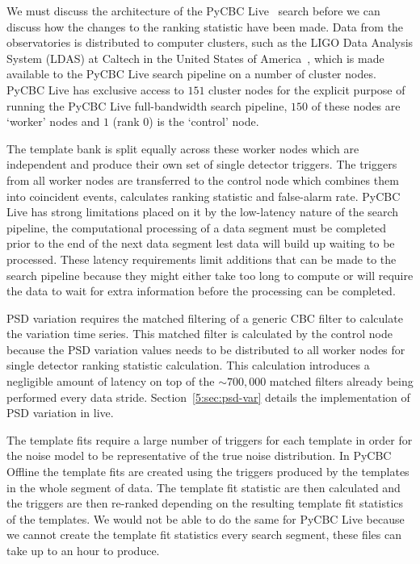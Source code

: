 We must discuss the architecture of the PyCBC Live~\cite{PyCBC_Live:2018} search before we can discuss how the changes to the ranking statistic have been made. Data from the \gwadj observatories is distributed to computer clusters, such as the LIGO Data Analysis System (LDAS) at Caltech in the United States of America~\cite{ldas_caltech:2024}, which is made available to the PyCBC Live search pipeline on a number of cluster nodes. PyCBC Live has exclusive access to $151$ cluster nodes for the explicit purpose of running the PyCBC Live full-bandwidth search pipeline, $150$ of these nodes are `worker' nodes and $1$ (rank 0) is the `control' node.

The template bank is split equally across these worker nodes which are independent and produce their own set of single detector triggers. The triggers from all worker nodes are transferred to the control node which combines them into coincident events, calculates ranking statistic and false-alarm rate. PyCBC Live has strong limitations placed on it by the low-latency nature of the search pipeline, the computational processing of a data segment must be completed prior to the end of the next data segment lest data will build up waiting to be processed. These latency requirements limit additions that can be made to the search pipeline because they might either take too long to compute or will require the data to wait for extra information before the processing can be completed.


PSD variation requires the matched filtering of a generic CBC filter to calculate the variation time series. This matched filter is calculated by the control node because the PSD variation values needs to be distributed to all worker nodes for single detector ranking statistic calculation. This calculation introduces a negligible amount of latency on top of the ${\sim}700,000$ matched filters already being performed every data stride. Section~\ref{5:sec:psd-var} details the implementation of PSD variation in live.

The template fits require a large number of triggers for each template in order for the noise model to be representative of the true noise distribution. In PyCBC Offline the template fits are created using the triggers produced by the templates in the whole segment of data. The template fit statistic are then calculated and the triggers are then re-ranked depending on the resulting template fit statistics of the templates. We would not be able to do the same for PyCBC Live because we cannot create the template fit statistics every search segment, these files can take up to an hour to produce.

